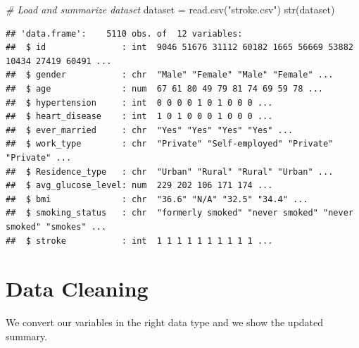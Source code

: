 \documentclass[
]{article}
\newenvironment{Shaded}{\begin{snugshade}}{\end{snugshade}}
\newcommand{\CommentTok}[1]{\textcolor[rgb]{0.56,0.35,0.01}{\textit{#1}}}
\newcommand{\FunctionTok}[1]{\textcolor[rgb]{0.00,0.00,0.00}{#1}}
\newcommand{\NormalTok}[1]{#1}
\newcommand{\OtherTok}[1]{\textcolor[rgb]{0.56,0.35,0.01}{#1}}
\newcommand{\StringTok}[1]{\textcolor[rgb]{0.31,0.60,0.02}{#1}}
\begin{document}
\hfill\break

\begin{Shaded}
\begin{Highlighting}[]
\CommentTok{\# Load and summarize dataset}
\NormalTok{dataset }\OtherTok{=} \FunctionTok{read.csv}\NormalTok{(}\StringTok{"stroke.csv"}\NormalTok{)}
\FunctionTok{str}\NormalTok{(dataset)}
\end{Highlighting}
\end{Shaded}

\begin{verbatim}
## 'data.frame':    5110 obs. of  12 variables:
##  $ id               : int  9046 51676 31112 60182 1665 56669 53882 10434 27419 60491 ...
##  $ gender           : chr  "Male" "Female" "Male" "Female" ...
##  $ age              : num  67 61 80 49 79 81 74 69 59 78 ...
##  $ hypertension     : int  0 0 0 0 1 0 1 0 0 0 ...
##  $ heart_disease    : int  1 0 1 0 0 0 1 0 0 0 ...
##  $ ever_married     : chr  "Yes" "Yes" "Yes" "Yes" ...
##  $ work_type        : chr  "Private" "Self-employed" "Private" "Private" ...
##  $ Residence_type   : chr  "Urban" "Rural" "Rural" "Urban" ...
##  $ avg_glucose_level: num  229 202 106 171 174 ...
##  $ bmi              : chr  "36.6" "N/A" "32.5" "34.4" ...
##  $ smoking_status   : chr  "formerly smoked" "never smoked" "never smoked" "smokes" ...
##  $ stroke           : int  1 1 1 1 1 1 1 1 1 1 ...
\end{verbatim}

\section{Data Cleaning}

We convert our variables in the right data type and we show the updated
summary.\\
\end{document}
